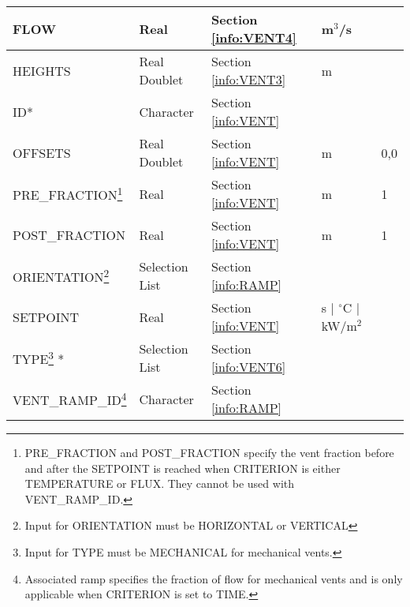 \begin{minipage}{6.5in}
\begin{longtable}{@{\extracolsep{\fill}}|l|l|l|l|l|}
{\ct FLOW}      	 					 & Real  		  & Section \ref{info:VENT4}     & m$^3$/s                     &                 \\ \hline
{\ct HEIGHTS}      					 & Real Doublet  	  & Section \ref{info:VENT3}     & m                           &                 \\ \hline
{\ct ID}*                                                         & Character  	          & Section \ref{info:VENT}      &                             &                 \\ \hline
{\ct OFFSETS}       					 & Real Doublet 		  & Section \ref{info:VENT}      & m                           &      0,0        \\ \hline
{\ct PRE\_FRACTION}\footnote{{\ct PRE\_FRACTION} and {\ct POST\_FRACTION} specify the vent fraction before and after the {\ct SETPOINT} is reached when {\ct CRITERION} is either {\ct TEMPERATURE} or {\ct FLUX}. They cannot be used with {\ct VENT\_RAMP\_ID}.}       					 & Real 		  & Section \ref{info:VENT}      & m                           &      1        \\ \hline
{\ct POST\_FRACTION}       					 & Real 		  & Section \ref{info:VENT}      & m                           &      1        \\ \hline
{\ct ORIENTATION}\footnote{Input for {\ct ORIENTATION} must be {\ct HORIZONTAL} or {\ct VERTICAL}}  					 & Selection List  		  & Section \ref{info:RAMP}      &                             &                 \\ \hline
{\ct SETPOINT}           					 & Real  	          & Section \ref{info:VENT}      & s $\mid$ $^\circ$C $\mid$ kW/m$^2$ &                 \\ \hline
{\ct TYPE}\footnote{Input for {\ct TYPE} must be {\ct MECHANICAL} for mechanical vents. } *
                                                                 & Selection List         & Section \ref{info:VENT6}     &                             &                 \\ \hline
{\ct VENT\_RAMP\_ID}\footnote{Associated ramp specifies the fraction of flow for mechanical vents and is only applicable when {\ct CRITERION} is set to {\ct TIME}.}  					 & Character  		  & Section \ref{info:RAMP}      &                             &                 \\ \hline
\end{longtable}
\end{minipage}


